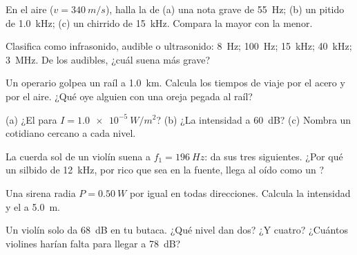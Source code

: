\begin{exercise}[$\star$]\label{exo:g12:sound-acoustics:1}
En el aire ($v = \qty{340}{m/s}$), halla la  de (a) una
nota grave de \qty{55}{Hz}; (b) un pitido de \qty{1.0}{kHz}; (c) un
chirrido de \qty{15}{kHz}. Compara la mayor con la menor.
\end{exercise}

\begin{exercise}[$\star$]\label{exo:g12:sound-acoustics:2}
Clasifica como infrasonido,  audible o ultrasonido: \qty{8}{Hz};
\qty{100}{Hz}; \qty{15}{kHz}; \qty{40}{kHz}; \qty{3}{MHz}. De los
audibles, ¿cuál suena más grave?
\end{exercise}

\begin{exercise}[$\star$]\label{exo:g12:sound-acoustics:3}
Un operario golpea un raíl a \qty{1.0}{km}. Calcula los tiempos de viaje
por el acero y por el aire. ¿Qué oye alguien con una oreja pegada al
raíl?
\end{exercise}

\begin{exercise}[$\star$]\label{exo:g12:sound-acoustics:4}
(a) ¿El  para $I = \qty{1.0e-5}{W/m^2}$? (b) ¿La intensidad
a \qty{60}{dB}? (c) Nombra un  cotidiano cercano a cada nivel.
\end{exercise}

\begin{exercise}[$\star$]\label{exo:g12:sound-acoustics:5}
La cuerda sol de un violín suena a $f_1 = \qty{196}{Hz}$: da sus tres
 siguientes. ¿Por qué un silbido de \qty{12}{kHz}, por rico que
sea en la fuente, llega al oído como un ?
\end{exercise}

\begin{exercise}[$\star\star$]\label{exo:g12:sound-acoustics:6}
Una sirena radia $P = \qty{0.50}{W}$ por igual en todas direcciones.
Calcula la intensidad y el  a \qty{5.0}{m}.
\end{exercise}

\begin{exercise}[$\star\star$]\label{exo:g12:sound-acoustics:7}
Un violín solo da \qty{68}{dB} en tu butaca. ¿Qué nivel dan dos? ¿Y
cuatro? ¿Cuántos violines harían falta para llegar a \qty{78}{dB}?
\end{exercise}

